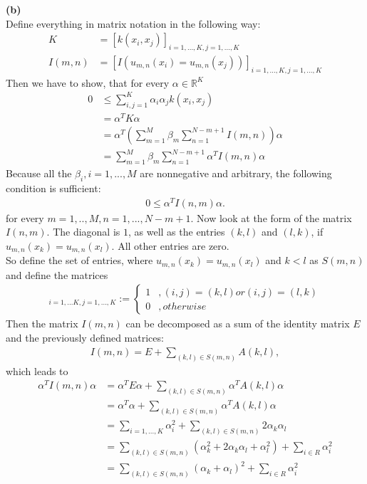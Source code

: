 \documentclass[a4paper]{article}
\newcommand{\1}{\mathds{1}}
\begin{document}
\textbf{(b)}\\
Define everything in matrix notation in the following way:
\begin{align*}
K&=[k(x_i,x_j)]_{i=1,...,K,j=1,...,K}\\
I(m,n)&=[I(u_{m,n}(x_i)=u_{m,n}(x_j))]_{i=1,...,K,j=1,...,K}
\end{align*}
Then we have to show, that for every $\alpha\in\mathbb{R}^K$ 
\begin{align*}
0&\leq\sum_{i,j=1}^{K}\alpha_i\alpha_jk(x_i,x_j)\\
&=\alpha^TK\alpha\\
&=\alpha^T\left(\sum_{m=1}^{M}\beta_m\sum_{n=1}^{N-m+1}I(m,n)\right)\alpha\\
&=\sum_{m=1}^{M}\beta_m\sum_{n=1}^{N-m+1}\alpha^TI(m,n)\alpha
\end{align*}
Because all the $\beta_i,i=1,...,M$ are nonnegative and arbitrary, the following condition is sufficient:
\begin{align*}
0\leq\alpha^TI(n,m)\alpha.
\end{align*}
for every $m=1,..,M,n=1,...,N-m+1$. Now look at the form of the matrix $I(n,m)$. The diagonal is $1$, as well as the entries $(k,l)$ and $(l,k)$, if $u_{m,n}(x_k)=u_{m,n}(x_l)$. All other entries are zero.\\
So define the set of entries, where $u_{m,n}(x_k)=u_{m,n}(x_l)$ and $k<l$ as $S(m,n)$ and define the matrices
\begin{align*}
[A(k,l)]_{i=1,...K,j=1,...,K}:=\begin{cases}
1 &,(i,j)=(k,l) or (i,j)=(l,k)\\
0 &,otherwise
\end{cases}
\end{align*}
Then the matrix $I(m,n)$ can be decomposed as a sum of the identity matrix $E$ and the previously defined matrices:
\begin{align*}
I(m,n)=E+\sum_{(k,l)\in S(m,n)}A(k,l),
\end{align*}
which leads to
\begin{align*}
\alpha^TI(m,n)\alpha&=\alpha^TE\alpha+\sum_{(k,l)\in S(m,n)}\alpha^TA(k,l)\alpha\\
&=\alpha^T\alpha+\sum_{(k,l)\in S(m,n)}\alpha^TA(k,l)\alpha\\
&=\sum_{i=1,...,K}\alpha^2_i+\sum_{(k,l)\in S(m,n)}2\alpha_k\alpha_l\\
&=\sum_{(k,l)\in S(m,n)}\left(\alpha_k^2+2\alpha_k\alpha_l+\alpha^2_l\right)+\sum_{i\in R}\alpha^2_i\\
&=\sum_{(k,l)\in S(m,n)}(\alpha_k+\alpha_l)^2+\sum_{i\in R}\alpha^2_i\\
\end{align*}
\end{document}
